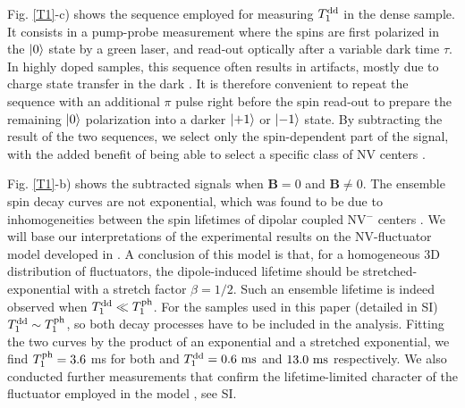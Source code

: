 \documentclass[preprintnumbers,amsmath,amssymb,superscriptaddress,twocolumn,showpacs]{revtex4-2}
\begin{document}
Fig. \ref{T1}-c) shows the sequence employed for measuring $T_1^{\rm dd}$ in the dense sample. 
It consists in a pump-probe measurement where the spins are first polarized in the $\ket{0}$ state by a green laser, and read-out optically after a variable dark time $\tau$. In highly doped samples, this sequence often results in artifacts, mostly due to charge state transfer in the dark \citep{giri_coupled_2018, giri_selective_2019}. It is therefore convenient to repeat the sequence with an additional $\pi$ pulse right before the spin read-out to prepare the remaining $\ket{0}$ polarization into a darker $\ket{+1}$ or $\ket{-1}$ state. By subtracting the result of the two sequences, we select only the spin-dependent part of the signal, with the added benefit of being able to select a specific class of NV centers \citep{jarmola_temperature-_2012, mrozek_longitudinal_2015, choi2017depolarization}. 

Fig. \ref{T1}-b) shows the subtracted signals when $\bm B=0$ and $\bm B \neq 0$.
The ensemble spin decay curves are not exponential, which was found to be due to inhomogeneities between the spin lifetimes of dipolar coupled NV$^-$ centers \citep{choi2017depolarization}.
We will base our interpretations of the experimental results on the NV-fluctuator model developed in \citep{choi2017depolarization}. A conclusion of this model is that, for a homogeneous 3D distribution of fluctuators, the dipole-induced lifetime should be stretched-exponential with a stretch factor $\beta=1/2$. Such an ensemble lifetime is indeed observed when $T_1^{\rm dd} \ll T_1^{\rm ph}$.
For the samples used in this paper (detailed in SI) $T_1^{\rm dd} \sim T_1^{\rm ph}$, so both decay processes have to be included in the analysis. Fitting the two curves by the product of an exponential and a stretched exponential, we find $T_1^{\rm ph}=3.6$ ms for both and $T_1^{\rm dd}= 0.6\ \rm ms$ and $13.0\ \rm ms$ respectively. We also conducted further measurements that confirm the lifetime-limited character of the fluctuator employed in the model \citep{choi2017depolarization}, see SI. 
\end{document}
